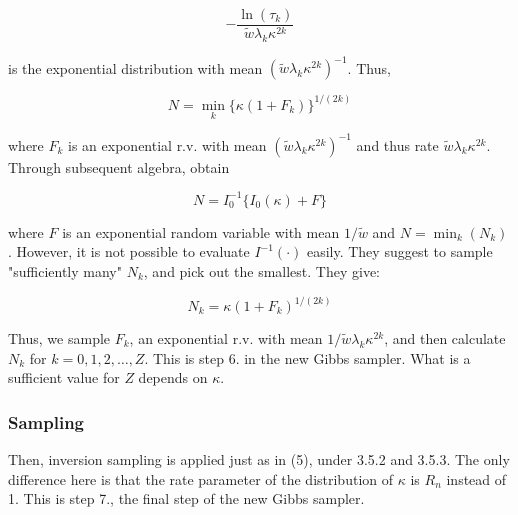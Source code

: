 \documentclass[12pt,a4paper]{article}
\begin{document}
$$ - \frac{\ln(\tau_k)}{\tilde{w} \lambda_k \kappa^{2k}} $$ 

is the exponential distribution with mean $(\tilde{w} \lambda_k \kappa^{2k})^{-1} $. Thus,
 
$$ N = \min_k \{ \kappa (1 + F_k) \}^{1/(2k)} $$ 

where $F_k$ is an exponential r.v. with mean $(\tilde{w} \lambda_k \kappa^{2k})^{-1}$ and thus rate $\tilde{w} \lambda_k \kappa^{2k}$. Through subsequent algebra, \citet{damien1999fullbayes} obtain

$$ N = I_0^{-1} \{  I_0(\kappa) + F\}$$

where $F$ is an exponential random variable with mean $1 / \tilde{w}$ and $N = \min_k (N_k)$.  However, it is not possible to evaluate $I^{-1} (\cdot)$ easily. They suggest to sample "sufficiently many" $N_k$, and pick out the smallest. They give:

$$ N_k = \kappa(1 + F_k)^{1/(2k)} $$

Thus, we sample $F_k$, an exponential r.v. with mean $1/\tilde{w}\lambda_k \kappa^{2k}$, and then calculate $N_k$ for $k = 0, 1, 2, \dots , Z$. This is step 6. in the new Gibbs sampler. What is a sufficient value for $Z$ depends on $\kappa$.

\subsubsection{Sampling}

Then, inversion sampling is applied just as in (5), under 3.5.2 and 3.5.3. The only difference here is that the rate parameter of the distribution of $\kappa$ is $R_n$ instead of 1. This is step 7., the final step of the new Gibbs sampler.



\end{document}
